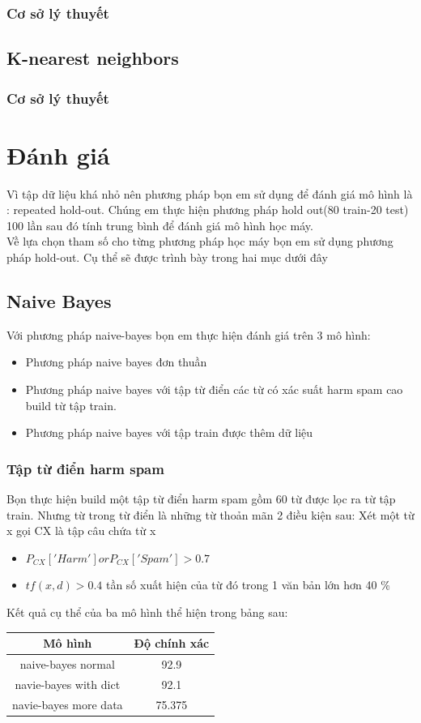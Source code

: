 \documentclass[a4paper,12pt]{report}
\begin{document}
\subsection{Cơ sở lý thuyết}
\section{K-nearest neighbors}
\subsection{Cơ sở lý thuyết}
\chapter{Đánh giá}
Vì tập dữ liệu khá nhỏ nên phương pháp bọn em sử dụng để đánh giá mô hình là : repeated hold-out. Chúng em thực hiện phương pháp hold out(80 train-20 test) 100 lần sau đó tính trung bình để đánh giá mô hình học máy.\\

Về lựa chọn tham số cho từng phương pháp học máy bọn em sử dụng phương pháp hold-out. Cụ thể sẽ được trình bày trong hai mục dưới đây
\section{Naive Bayes}
Với phương pháp naive-bayes bọn em thực hiện đánh giá trên 3 mô hình:
\begin{itemize}
\item Phương pháp naive bayes đơn thuần
\item Phương pháp naive bayes với tập từ điển các từ có xác suất harm spam cao build từ tập train.
\item Phương pháp naive bayes với tập train được thêm dữ liệu
\end{itemize}
\subsection{Tập từ điển harm spam}
Bọn thực hiện build một tập từ điển harm spam gồm 60 từ được lọc ra từ tập train. Nhưng từ trong từ điển là những từ thoản mãn 2 điều kiện sau:
Xét một từ x gọi CX là  tập câu chứa từ x
\begin{itemize}
\item $P_{CX}['Harm'] or P_{CX}['Spam'] >0.7$
\item $tf(x,d) >0.4$ tần số xuất hiện của từ đó trong 1 văn bản lớn hơn 40 \%
\end{itemize}
Kết quả cụ thể của ba mô hình thể hiện trong bảng sau:
\begin{longtable}{|c|c|}
\hline 
Mô hình & Độ chính xác \\ \hline
naive-bayes normal & 92.9\\ \hline
navie-bayes with dict & 92.1 \\ \hline
navie-bayes more data & 75.375\\ \hline
\end{longtable}
\end{document}
